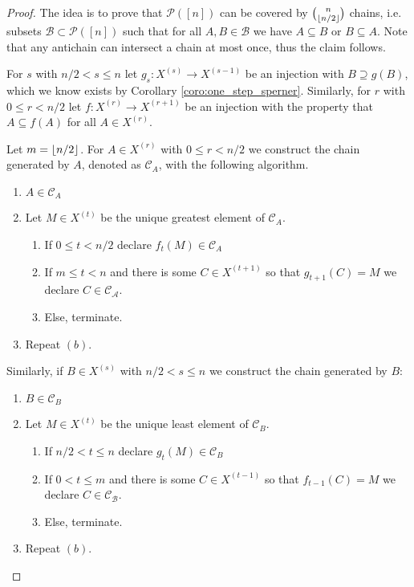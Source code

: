 \documentclass{report}
\DeclarePairedDelimiter\floor{\lfloor}{\rfloor}
\theoremstyle{definition}
\theoremstyle{plain}
\theoremstyle{definition}
\begin{document}
 	\begin{proof}
 		The idea is to prove that $\mathcal{P}([n])$ can be covered by $\binom{n}{\floor{n/2}}$ chains, i.e. subsets $\mathcal{B}\subset \mathcal{P}([n])$ such that for all $A,B\in \mathcal{B}$ we have $A\subseteq B$ or $B\subseteq A$. Note that any antichain can intersect a chain at most once, thus the claim follows.
 		
 		For $s$ with $n/2 < s \leq n$ let $g_s\colon X^{(s)} \to X^{(s-1)}$ be an injection with $B\supseteq g(B)$, which we know exists by Corollary \ref{coro:one_step_sperner}. Similarly, for $r$ with $0\leq r < n/2$ let $f\colon X^{(r)} \to X^{(r+1)}$ be an injection with the property that $A\subseteq f(A)$ for all $A\in X^{(r)}$.
 		
 		Let $m = \floor{n/2}$. For $A\in X^{(r)}$ with $0\leq r < n/2$ we construct the chain generated by $A$, denoted as $\mathcal{C}_A$, with the following algorithm.
 		\begin{enumerate}
 			\item $A\in\mathcal{C}_A$
 			\item Let $M\in X^{(t)}$ be the unique greatest element of $\mathcal{C}_A$.
 			\begin{enumerate}
 				\item If $0\leq t < n/2$ declare $f_t(M)\in \mathcal{C}_A$
 				\item If $m \leq t < n$ and there is some $C\in X^{(t+1)}$ so that $g_{t+1}(C) = M$ we declare $C \in \mathcal{C_A}$.
 				\item Else, terminate.  
 			\end{enumerate}
 			\item Repeat $(b)$.
 		\end{enumerate}
 		
 		Similarly, if $B\in X^{(s)}$ with $n/2 < s \leq n$ we construct the chain generated by $B$:
 		\begin{enumerate}
 			\item $B\in\mathcal{C}_B$
 			\item Let $M\in X^{(t)}$ be the unique least element of $\mathcal{C}_B$.
 			\begin{enumerate}
 				\item If $n/2 < t \leq n$ declare $g_t(M)\in \mathcal{C}_B$
 				\item If $0< t \leq m$ and there is some $C\in X^{(t-1)}$ so that $f_{t-1}(C) = M$ we declare $C \in \mathcal{C_B}$.
 				\item Else, terminate.  
 			\end{enumerate}
 			\item Repeat $(b)$.
 		\end{enumerate}
 		

\end{proof}
\end{document}
